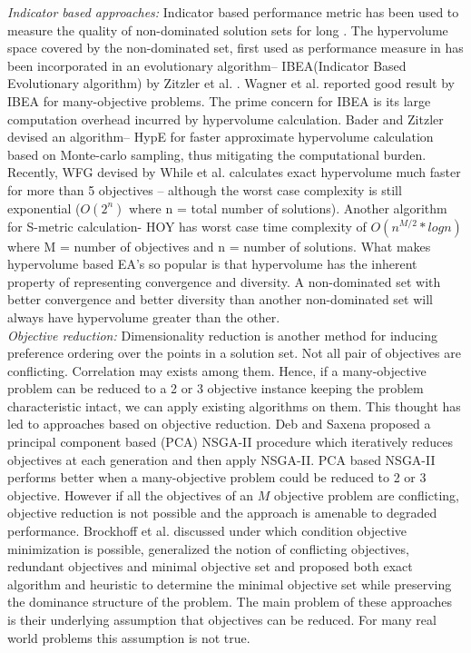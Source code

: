 \documentclass[journal]{IEEEtran}
\begin{document}
\textit{Indicator based approaches:}
Indicator based performance metric has been used to measure the quality of non-dominated solution sets for long \cite{knowles2002metrics}\cite{zitzler2003performance}\cite{okabe2003critical}. The hypervolume space covered by the non-dominated set, first used as performance measure in \cite{zitzler1998multiobjective} has been incorporated in an evolutionary algorithm-- IBEA(Indicator Based Evolutionary algorithm) by Zitzler et al. \cite{zitzler2004indicator}. Wagner et al. \cite{wagner2007pareto} reported good result by IBEA for many-objective problems. The prime concern for IBEA is its large computation overhead incurred by hypervolume calculation. Bader and Zitzler devised an algorithm-- HypE \cite{bader2011hype}  for faster approximate hypervolume calculation based on Monte-carlo sampling, thus mitigating the computational burden. Recently, WFG devised by While et al. \cite{while2012fast} calculates exact hypervolume much faster for more than 5 objectives – although the worst case complexity is still exponential ($O(2^n)$ where n = total number of solutions). Another algorithm for S-metric calculation- HOY has worst case time complexity of $O(n^{M/2}*log n)$ where M = number of objectives and n = number of solutions. What makes hypervolume based EA's so popular is that hypervolume has the inherent property of representing convergence and diversity. A non-dominated set with better convergence and better diversity than another non-dominated set will always have hypervolume greater than the other.\\

\textit{Objective reduction:}
Dimensionality reduction is another method for inducing preference ordering over the points in a solution set. Not all pair of objectives are conflicting. Correlation may exists among them. Hence, if a many-objective problem can be reduced to a 2 or 3 objective instance keeping the problem characteristic intact, we can apply existing algorithms on them. This thought has led to approaches based on objective reduction. Deb and Saxena \cite{deb2005finding} proposed a principal component based (PCA) NSGA-II procedure which iteratively reduces objectives at each generation and then apply NSGA-II. PCA based NSGA-II performs better when a many-objective problem could be reduced to 2 or 3 objective. However if all the objectives of an $M$ objective problem are conflicting, objective reduction is not possible and the approach is amenable to degraded performance. Brockhoff et al. \cite{brockhoff2009objective}\cite{brockhoff2006all} discussed under which condition objective minimization is possible, generalized the notion of conflicting objectives, redundant objectives and minimal objective set and proposed both exact algorithm and heuristic to determine the minimal objective set while preserving the dominance structure of the problem. The main problem of these approaches is their underlying assumption that objectives can be reduced. For many real world problems this assumption is not true.\\
\end{document}

